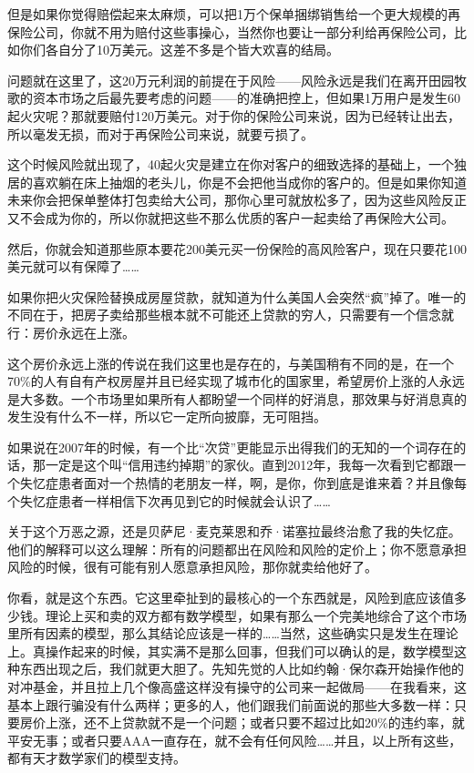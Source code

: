 但是如果你觉得赔偿起来太麻烦，可以把1万个保单捆绑销售给一个更大规模的再保险公司，你就不用为赔付这些事操心，当然你也要让一部分利给再保险公司，比如你们各自分了10万美元。这差不多是个皆大欢喜的结局。

问题就在这里了，这20万元利润的前提在于风险------风险永远是我们在离开田园牧歌的资本市场之后最先要考虑的问题------的准确把控上，但如果1万用户是发生60起火灾呢？那就要赔付120万美元。对于你的保险公司来说，因为已经转让出去，所以毫发无损，而对于再保险公司来说，就要亏损了。

这个时候风险就出现了，40起火灾是建立在你对客户的细致选择的基础上，一个独居的喜欢躺在床上抽烟的老头儿，你是不会把他当成你的客户的。但是如果你知道未来你会把保单整体打包卖给大公司，那你心里可就放松多了，因为这些风险反正又不会成为你的，所以你就把这些不那么优质的客户一起卖给了再保险大公司。

然后，你就会知道那些原本要花200美元买一份保险的高风险客户，现在只要花100美元就可以有保障了\ldots{}\ldots{}

如果你把火灾保险替换成房屋贷款，就知道为什么美国人会突然``疯''掉了。唯一的不同在于，把房子卖给那些根本就不可能还上贷款的穷人，只需要有一个信念就行：房价永远在上涨。

这个房价永远上涨的传说在我们这里也是存在的，与美国稍有不同的是，在一个70\%的人有自有产权房屋并且已经实现了城市化的国家里，希望房价上涨的人永远是大多数。一个市场里如果所有人都盼望一个同样的好消息，那效果与好消息真的发生没有什么不一样，所以它一定所向披靡，无可阻挡。

如果说在2007年的时候，有一个比``次贷''更能显示出得我们的无知的一个词存在的话，那一定是这个叫``信用违约掉期''的家伙。直到2012年，我每一次看到它都跟一个失忆症患者面对一个热情的老朋友一样，啊，是你，你到底是谁来着？并且像每个失忆症患者一样相信下次再见到它的时候就会认识了\ldots{}\ldots{}

关于这个万恶之源，还是贝萨尼·麦克莱恩和乔·诺塞拉最终治愈了我的失忆症。他们的解释可以这么理解：所有的问题都出在风险和风险的定价上；你不愿意承担风险的时候，很有可能有别人愿意承担风险，那你就卖给他好了。

你看，就是这个东西。它这里牵扯到的最核心的一个东西就是，风险到底应该值多少钱。理论上买和卖的双方都有数学模型，如果有那么一个完美地综合了这个市场里所有因素的模型，那么其结论应该是一样的\ldots{}\ldots{}当然，这些确实只是发生在理论上。真操作起来的时候，其实满不是那么回事，但我们可以确认的是，数学模型这种东西出现之后，我们就更大胆了。先知先觉的人比如约翰·保尔森开始操作他的对冲基金，并且拉上几个像高盛这样没有操守的公司来一起做局------在我看来，这基本上跟行骗没有什么两样；更多的人，他们跟我们前面说的那些大多数一样：只要房价上涨，还不上贷款就不是一个问题；或者只要不超过比如20\%的违约率，就平安无事；或者只要AAA一直存在，就不会有任何风险\ldots{}\ldots{}并且，以上所有这些，都有天才数学家们的模型支持。

